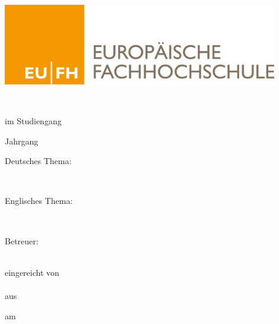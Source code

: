 \begin{titlepage}

	\begin{center}
    \includegraphics[width=12cm]{abbildungen/00EufhLogo} \\
    \vspace{3cm}
		
		\textsc{\ArtDerArbeit}\\
		\vspace{.5cm}
		
		im Studiengang \Studiengang \\
		\vspace{.5cm}
		
		Jahrgang \Jahrgang \\
		\vspace{2cm}
		
		Deutsches Thema:\\
		\vspace{.5cm}
		
		\textbf{\DeutschesThema}\\
		\vspace{2cm}
		
		Englisches Thema:\\
		\vspace{.5cm}		
		
		\textbf{\EnglischesThema}\\
		\vspace{2cm}
		
		Betreuer: \\ \Betreuer \\
		\vspace{1cm}		
		
		eingereicht von \\ \Autor \\ aus \Wohnort \\
		\vspace{1cm}
		
		am \Datum \\
		\vspace{.5cm}
	\end{center}
	
\end{titlepage}

